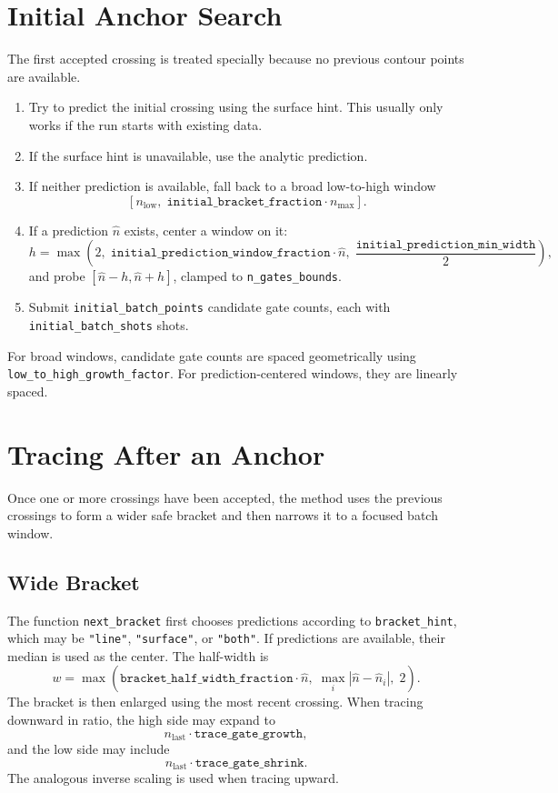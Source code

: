 \documentclass[11pt]{article}
\begin{document}
\section{Initial Anchor Search}

The first accepted crossing is treated specially because no previous contour
points are available.

\begin{enumerate}[leftmargin=*]
    \item Try to predict the initial crossing using the surface hint.
    This usually only works if the run starts with existing data.
    \item If the surface hint is unavailable, use the analytic prediction.
    \item If neither prediction is available, fall back to a broad low-to-high
    window
    \[
        [n_{\mathrm{low}},\;
        \texttt{initial\_bracket\_fraction} \cdot n_{\mathrm{max}}].
    \]
    \item If a prediction $\hat n$ exists, center a window on it:
    \[
        h =
        \max\left(
            2,\;
            \texttt{initial\_prediction\_window\_fraction}\cdot \hat n,\;
            \frac{\texttt{initial\_prediction\_min\_width}}{2}
        \right),
    \]
    and probe $[\hat n - h, \hat n + h]$, clamped to
    \texttt{n\_gates\_bounds}.
    \item Submit \texttt{initial\_batch\_points} candidate gate counts, each
    with \texttt{initial\_batch\_shots} shots.
\end{enumerate}

For broad windows, candidate gate counts are spaced geometrically using
\texttt{low\_to\_high\_growth\_factor}. For prediction-centered windows, they
are linearly spaced.

\section{Tracing After an Anchor}

Once one or more crossings have been accepted, the method uses the previous
crossings to form a wider safe bracket and then narrows it to a focused batch
window.

\subsection{Wide Bracket}

The function \texttt{next\_bracket} first chooses predictions according to
\texttt{bracket\_hint}, which may be \texttt{"line"}, \texttt{"surface"}, or
\texttt{"both"}. If predictions are available, their median is used as the
center. The half-width is
\[
    w =
    \max\left(
        \texttt{bracket\_half\_width\_fraction}\cdot \hat n,\;
        \max_i |\hat n - \hat n_i|,\;
        2
    \right).
\]
The bracket is then enlarged using the most recent crossing. When tracing
downward in ratio, the high side may expand to
\[
    n_{\mathrm{last}} \cdot \texttt{trace\_gate\_growth},
\]
and the low side may include
\[
    n_{\mathrm{last}} \cdot \texttt{trace\_gate\_shrink}.
\]
The analogous inverse scaling is used when tracing upward.
\end{document}

